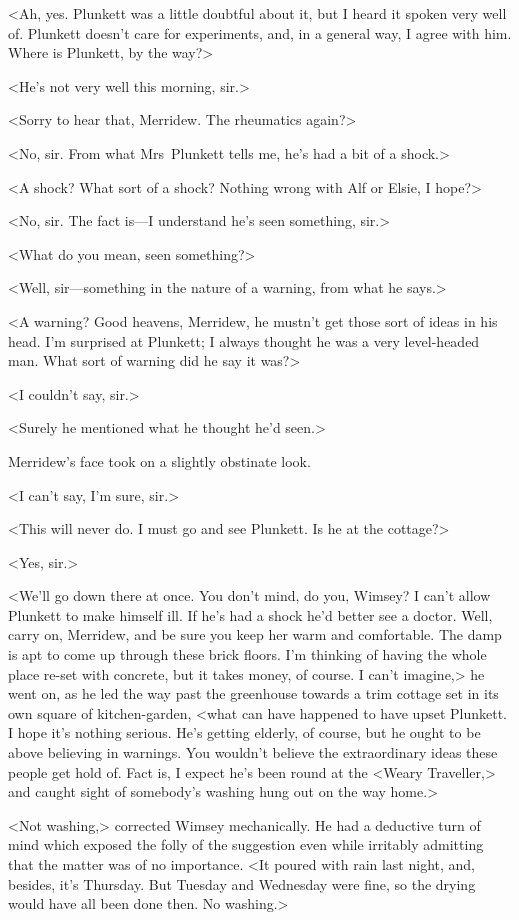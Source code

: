 <Ah, yes. Plunkett was a little doubtful about it, but I heard it spoken very well of. Plunkett doesn't care for experiments, and, in a general way, I agree with him. Where is Plunkett, by the way?>

<He's not very well this morning, sir.>

<Sorry to hear that, Merridew. The rheumatics again?>

<No, sir. From what Mrs~Plunkett tells me, he's had a bit of a shock.>

<A shock? What sort of a shock? Nothing wrong with Alf or Elsie, I hope?>

<No, sir. The fact is—I understand he's seen something, sir.>

<What do you mean, seen something?>

<Well, sir—something in the nature of a warning, from what he says.>

<A warning? Good heavens, Merridew, he mustn't get those sort of ideas in his head. I'm surprised at Plunkett; I always thought he was a very level-headed man. What sort of warning did he say it was?>

<I couldn't say, sir.>

<Surely he mentioned what he thought he'd seen.>

Merridew's face took on a slightly obstinate look.

<I can't say, I'm sure, sir.>

<This will never do. I must go and see Plunkett. Is he at the cottage?>

<Yes, sir.>

<We'll go down there at once. You don't mind, do you, Wimsey? I can't allow Plunkett to make himself ill. If he's had a shock he'd better see a doctor. Well, carry on, Merridew, and be sure you keep her warm and comfortable. The damp is apt to come up through these brick floors. I'm thinking of having the whole place re-set with concrete, but it takes money, of course. I can't imagine,> he went on, as he led the way past the greenhouse towards a trim cottage set in its own square of kitchen-garden, <what can have happened to have upset Plunkett. I hope it's nothing serious. He's getting elderly, of course, but he ought to be above believing in warnings. You wouldn't believe the extraordinary ideas these people get hold of. Fact is, I expect he's been round at the <Weary Traveller,> and caught sight of somebody's washing hung out on the way home.>

<Not washing,> corrected Wimsey mechanically. He had a deductive turn of mind which exposed the folly of the suggestion even while irritably admitting that the matter was of no importance. <It poured with rain last night, and, besides, it's Thursday. But Tuesday and Wednesday were fine, so the drying would have all been done then. No washing.>

